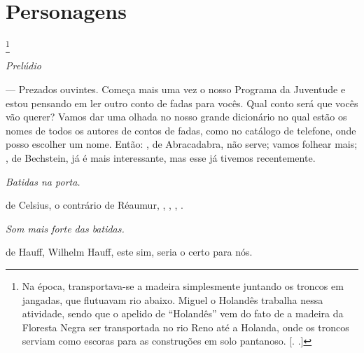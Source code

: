 \section{Personagens}

\begin{myparindent}{0pt}



\footnote{Na época, transportava-se a madeira
  simplesmente juntando os troncos em jangadas, que flutuavam rio
  abaixo. Miguel o Holandês trabalha nessa atividade, sendo que o
  apelido de ``Holandês'' vem do fato de a madeira da Floresta Negra ser
  transportada no rio Reno até a Holanda, onde os troncos serviam como
  escoras para as construções em solo pantanoso. [. .]}










\bigskip

\emph{Prelúdio}

\begin{Parskip}
 --- Prezados ouvintes. Começa mais uma vez o nosso Programa da
Juventude e estou pensando em ler outro conto de fadas para vocês. Qual
conto será que vocês vão querer? Vamos dar uma olhada no nosso grande
dicionário no qual estão os nomes de todos os autores de contos de
fadas, como no catálogo de telefone, onde posso escolher um nome. Então:
, de Abracadabra, não serve; vamos folhear mais; , de Bechstein, já é
mais interessante, mas esse já tivemos recentemente.

\emph{Batidas na porta.}

 de Celsius, o contrário de Réaumur, , , , .

\emph{Som mais forte das batidas.}

 de Hauff, Wilhelm Hauff, este sim, seria o certo para nós.


\end{Parskip}
\end{myparindent}

